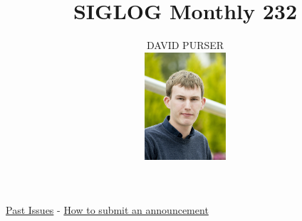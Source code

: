 \documentclass[prodmode,acmtecs]{acmsmall} %
\newcounter{colstart}
\begin{document}
\setcounter{colstart}{\thepage}

\title{\huge\sc SIGLOG Monthly 232}
\author{DAVID PURSER
\vspace*{-2.6cm}\begin{flushright}\includegraphics[width=30mm]{dp}\end{flushright}
}

\maketitlee

\href{https://lics.siglog.org/newsletters/}{Past Issues}
 - 
\href{https://lics.siglog.org/newsletters/inst.html}{How to submit an announcement}
\end{document}
